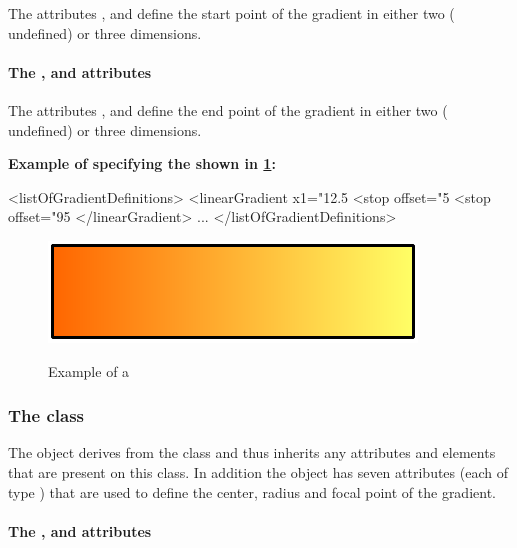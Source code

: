 The attributes ,  and  define the start point of the gradient in either two ( undefined) or three dimensions.

\paragraph{The \fixttspace{}, \fixttspace{} and \fixttspace{} attributes}

The attributes ,  and  define the end point of the gradient in either two ( undefined) or three dimensions.



{
  {\bf
Example of specifying the \LinearGradient shown in \ref{fig:lingrad}:
}
}
{\footnotesize
\begin{example}
<listOfGradientDefinitions>
  <linearGradient x1="12.5%
    <stop offset="5%
    <stop offset="95%
  </linearGradient>
        ...
</listOfGradientDefinitions>
\end{example}
}

\begin{figure}[h!]
  \centering
  \includegraphics{figures/lingrad01.pdf}\\
  \caption{Example of a \LinearGradient}
  \label{fig:lingrad}
\end{figure}


\subsubsection{The  class}
\label{radialgradient-class}


The \RadialGradient object derives from the \GradientBase class and thus
inherits any attributes and elements that are present on this class.
In addition the \RadialGradient object has seven attributes (each of type \RelAbsVector) that are used to define the center, radius and focal point of the gradient.



\paragraph{The \fixttspace{}, \fixttspace{} and \fixttspace{} attributes}

